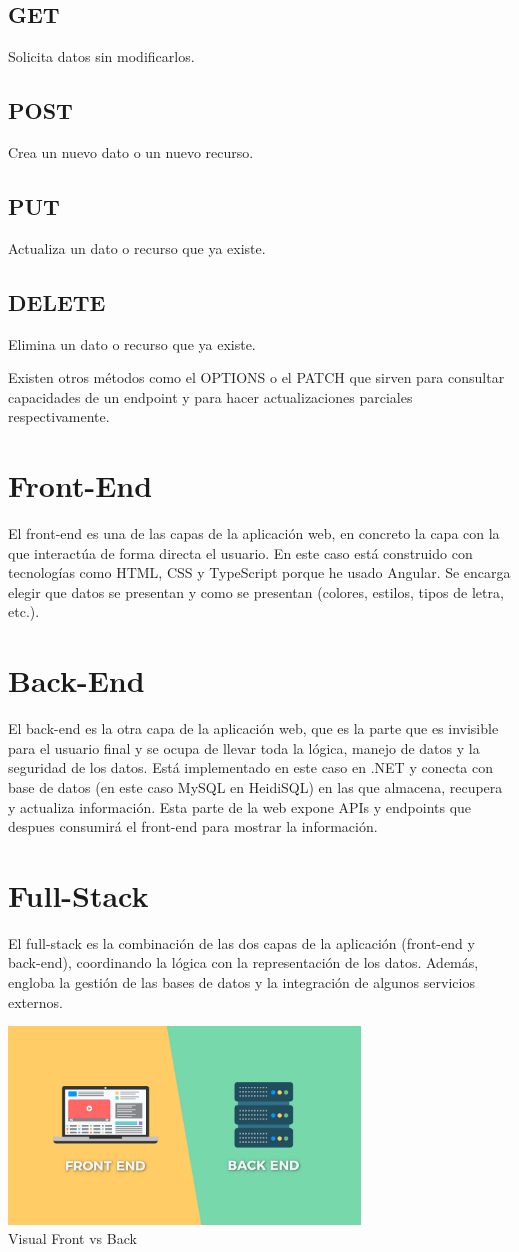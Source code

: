 \subsection{GET}
Solicita datos sin modificarlos.

\subsection{POST}
Crea un nuevo dato o un nuevo recurso.

\subsection{PUT}
Actualiza un dato o recurso que ya existe.

\subsection{DELETE}
Elimina un dato o recurso que ya existe.

Existen otros métodos como el OPTIONS o el PATCH que sirven para consultar capacidades de un endpoint
y para hacer actualizaciones parciales respectivamente.


\section{Front-End}
El front-end es una de las capas de la aplicación web, en concreto la capa con la que interactúa de forma directa el usuario. En este caso está construido con tecnologías como HTML, CSS y TypeScript porque he usado Angular. Se encarga elegir que datos se presentan y como se presentan (colores, estilos, tipos de letra, etc.).

\section{Back-End}
El back-end es la otra capa de la aplicación web, que es la parte que es invisible para el usuario final y se ocupa de llevar toda la lógica, manejo de datos y la seguridad de los datos. Está implementado en este caso en .NET y conecta con base de datos (en este caso MySQL en HeidiSQL) en las que almacena, recupera y actualiza información. Esta parte de la web expone APIs y endpoints que despues consumirá el front-end para mostrar la información.

\section{Full-Stack}
El full-stack es la combinación de las dos capas de la aplicación (front-end y back-end), coordinando la lógica con la representación de los datos. Además, engloba la gestión de las bases de datos y la integración de algunos servicios externos.


\begin{center}
  \includegraphics[width=0.7\textwidth]{img/front-back.png}\\
  \small Visual Front vs Back
\end{center}